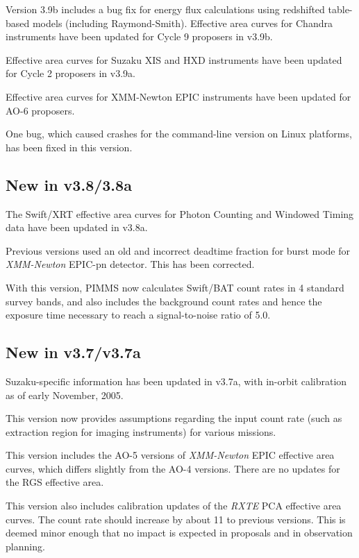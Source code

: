 Version 3.9b includes a bug fix for energy flux calculations using
redshifted table-based models (including Raymond-Smith).  Effective
area curves for Chandra instruments have been updated for Cycle 9
proposers in v3.9b.

Effective area curves for Suzaku XIS and HXD instruments have been
updated for Cycle 2 proposers in v3.9a.

Effective area curves for XMM-Newton EPIC instruments have been
updated for AO-6 proposers.

One bug, which caused crashes for the command-line version on Linux
platforms, has been fixed in this version.

\subsection{New in v3.8/3.8a}

The Swift/XRT effective area curves for Photon Counting and Windowed Timing
data have been updated in v3.8a.

Previous versions used an old and incorrect deadtime fraction for burst
mode for {\sl XMM-Newton\/} EPIC-pn detector.  This has been corrected.

With this version, PIMMS now calculates Swift/BAT count rates in 4 standard
survey bands, and also includes the background count rates and hence the
exposure time necessary to reach a signal-to-noise ratio of 5.0.

\subsection{New in v3.7/v3.7a}

Suzaku-specific information has been updated in v3.7a, with in-orbit
calibration as of early November, 2005.

This version now provides assumptions regarding the input count rate
(such as extraction region for imaging instruments) for various missions.

This version includes the AO-5 versions of {\sl XMM-Newton\/} EPIC effective area
curves, which differs slightly from the AO-4 versions.  There are no updates
for the RGS effective area.

This version also includes calibration updates of the {\sl RXTE\/} PCA
effective area curves.  The count rate should increase by about 11%
to previous versions.  This is deemed minor enough that no impact is expected
in proposals and in observation planning.

